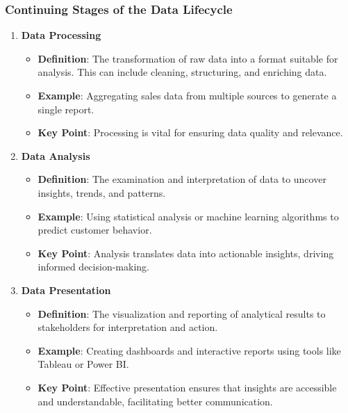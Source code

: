 \documentclass[aspectratio=169]{beamer}
\begin{document}
\begin{frame}[fragile]
    \frametitle{Continuing Stages of the Data Lifecycle}
    \begin{enumerate}[resume]
        \item \textbf{Data Processing}
            \begin{itemize}
                \item \textbf{Definition}: The transformation of raw data into a format suitable for analysis. This can include cleaning, structuring, and enriching data.
                \item \textbf{Example}: Aggregating sales data from multiple sources to generate a single report.
                \item \textbf{Key Point}: Processing is vital for ensuring data quality and relevance.
            \end{itemize}
        \item \textbf{Data Analysis}
            \begin{itemize}
                \item \textbf{Definition}: The examination and interpretation of data to uncover insights, trends, and patterns.
                \item \textbf{Example}: Using statistical analysis or machine learning algorithms to predict customer behavior.
                \item \textbf{Key Point}: Analysis translates data into actionable insights, driving informed decision-making.
            \end{itemize}
        \item \textbf{Data Presentation}
            \begin{itemize}
                \item \textbf{Definition}: The visualization and reporting of analytical results to stakeholders for interpretation and action.
                \item \textbf{Example}: Creating dashboards and interactive reports using tools like Tableau or Power BI.
                \item \textbf{Key Point}: Effective presentation ensures that insights are accessible and understandable, facilitating better communication.
            \end{itemize}
    \end{enumerate}
\end{frame}
\end{document}
